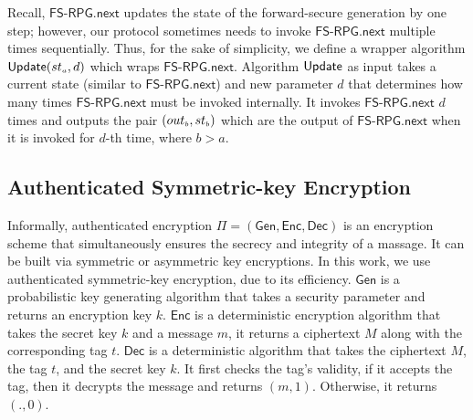 Recall, $\mathsf{FS\text{-}RPG.next}$ updates the state of the forward-secure generation by one step; however, our protocol sometimes needs to invoke $\mathsf{FS\text{-}RPG.next}$ multiple times sequentially. Thus, for the sake of simplicity, we define a wrapper algorithm $ \mathsf{Update}({st}_{\scriptscriptstyle a}, d)$ which wraps  $\mathsf{FS\text{-}RPG.next}$. Algorithm $\mathsf{Update}$  as input takes a current state (similar to $\mathsf{FS\text{-}RPG.next}$) and new parameter $d$ that determines how many times   $\mathsf{FS\text{-}RPG.next}$ must be invoked internally. It invokes  $\mathsf{FS\text{-}RPG.next}$ $d$ times and outputs the pair  $({out}_{\scriptscriptstyle b}, {st}_{\scriptscriptstyle b})$  which are the output of $\mathsf{FS\text{-}RPG.next}$ when it is invoked for $d$-th time, where $ b> a$. 




 \vspace{2mm}
 
\subsection{Authenticated Symmetric-key Encryption} 
Informally, authenticated encryption $\Pi=(\mathsf{Gen}, \mathsf{Enc}, \mathsf{Dec})$ is an encryption scheme that simultaneously ensures the secrecy and integrity of a massage. It can be built via symmetric or asymmetric key encryptions. In this work, we use authenticated symmetric-key encryption, due to its efficiency. $\mathsf{Gen}$ is a probabilistic key generating algorithm that takes a security parameter and returns an encryption key $k$. $\mathsf{Enc}$ is a deterministic encryption algorithm that takes the secret key $k$ and a message $m$, it returns a ciphertext $M$ along with the corresponding tag $t$. $\mathsf{Dec}$ is a deterministic algorithm that takes the ciphertext $M$, the tag $t$, and the secret key $k$. It first checks the tag's validity, if it accepts the tag, then it decrypts the message and returns $(m,1)$. Otherwise, it returns $(.,0)$. 


